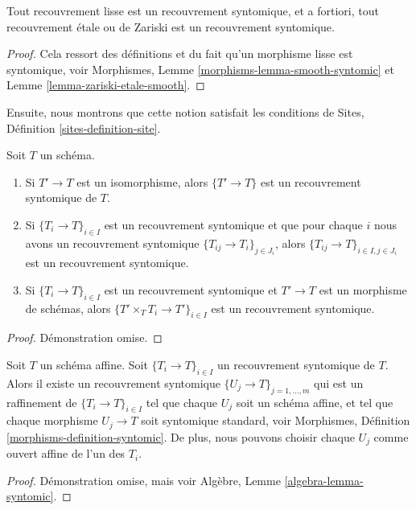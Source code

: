 \begin{lemma}
\label{lemma-zariski-etale-smooth-syntomic}
Tout recouvrement lisse est un recouvrement syntomique, et a fortiori, tout recouvrement étale ou de Zariski est un recouvrement syntomique.
\end{lemma}

\begin{proof}
Cela ressort des définitions et du fait qu'un morphisme lisse est syntomique, voir Morphismes, Lemme \ref{morphisms-lemma-smooth-syntomic} et Lemme \ref{lemma-zariski-etale-smooth}.
\end{proof}


\noindent
Ensuite, nous montrons que cette notion satisfait les conditions de Sites, Définition \ref{sites-definition-site}.

\begin{lemma}
\label{lemma-syntomic}
Soit $T$ un schéma.
\begin{enumerate}
\item Si $T' \to T$ est un isomorphisme, alors $\{T' \to T\}$ est un recouvrement syntomique de $T$.
\item Si $\{T_i \to T\}_{i\in I}$ est un recouvrement syntomique et que pour chaque $i$ nous avons un recouvrement syntomique $\{T_{ij} \to T_i\}_{j\in J_i}$, alors $\{T_{ij} \to T\}_{i \in I, j\in J_i}$ est un recouvrement syntomique.
\item Si $\{T_i \to T\}_{i\in I}$ est un recouvrement syntomique et $T' \to T$ est un morphisme de schémas, alors $\{T' \times_T T_i \to T'\}_{i\in I}$ est un recouvrement syntomique.
\end{enumerate}
\end{lemma}

\begin{proof}
Démonstration omise.
\end{proof}

\begin{lemma}
\label{lemma-syntomic-affine}
Soit $T$ un schéma affine. Soit $\{T_i \to T\}_{i \in I}$ un recouvrement syntomique de $T$. Alors il existe un recouvrement syntomique $\{U_j \to T\}_{j = 1, \ldots, m}$ qui est un raffinement de $\{T_i \to T\}_{i \in I}$ tel que chaque $U_j$ soit un schéma affine, et tel que chaque morphisme $U_j \to T$ soit syntomique standard, voir Morphismes, Définition \ref{morphisms-definition-syntomic}. De plus, nous pouvons choisir chaque $U_j$ comme ouvert affine de l'un des $T_i$.
\end{lemma}

\begin{proof}
Démonstration omise, mais voir Algèbre, Lemme \ref{algebra-lemma-syntomic}.
\end{proof}

